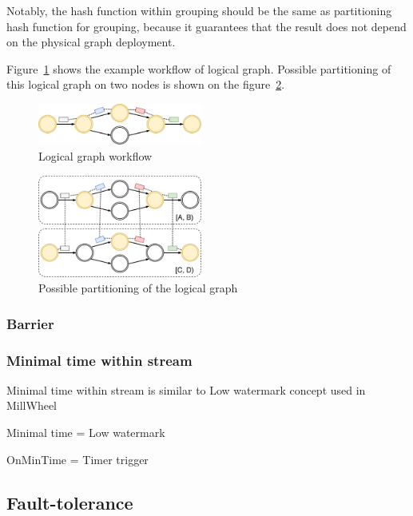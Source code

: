 Notably, the hash function within grouping should be the same as partitioning hash function for grouping, because it guarantees that the result does not depend on the physical graph deployment.

Figure~\ref{logical-graph-figure} shows the example workflow of logical graph. Possible partitioning of this logical graph on two nodes is shown on the figure~\ref{physical-graph-figure}.

\begin{figure}[htbp]
  \centering
  \includegraphics[width=0.48\textwidth]{pics/logical-graph}
  \caption{Logical graph workflow}
  \label {logical-graph-figure}
\end{figure}

\begin{figure}[htbp]
  \centering
  \includegraphics[width=0.48\textwidth]{pics/physical-graph}
  \caption{Possible partitioning of the logical graph}
  \label {physical-graph-figure}
\end{figure}

\subsubsection{Barrier}

\subsubsection{Minimal time within stream}
Minimal time within stream is similar to Low watermark concept used in MillWheel~\cite{Akidau:2013:MFS:2536222.2536229}

Minimal time = Low watermark

OnMinTime = Timer trigger

\subsection{Fault-tolerance}

